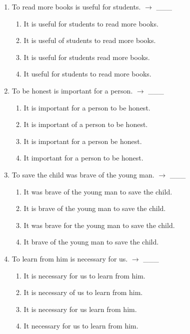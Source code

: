 \documentclass[11pt,a4paper]{ctexart}
\begin{document}
\begin{enumerate}[leftmargin=*,itemsep=4pt]
\begin{enumerate}[label=\Alph*.,leftmargin=2em,itemsep=1pt,topsep=2pt]
\item It is necessary of us to protect the environment.
\item It is necessary for us protect the environment.
\item It necessary for us to protect the environment.
\end{enumerate}
\item To read more books is useful for students. $\rightarrow$ \_\_\_
\begin{enumerate}[label=\Alph*.,leftmargin=2em,itemsep=1pt,topsep=2pt]
\item It is useful for students to read more books.
\item It is useful of students to read more books.
\item It is useful for students read more books.
\item It useful for students to read more books.
\end{enumerate}
\item To be honest is important for a person. $\rightarrow$ \_\_\_
\begin{enumerate}[label=\Alph*.,leftmargin=2em,itemsep=1pt,topsep=2pt]
\item It is important for a person to be honest.
\item It is important of a person to be honest.
\item It is important for a person be honest.
\item It important for a person to be honest.
\end{enumerate}
\item To save the child was brave of the young man. $\rightarrow$ \_\_\_
\begin{enumerate}[label=\Alph*.,leftmargin=2em,itemsep=1pt,topsep=2pt]
\item It was brave of the young man to save the child.
\item It is brave of the young man to save the child.
\item It was brave for the young man to save the child.
\item It brave of the young man to save the child.
\end{enumerate}
\item To learn from him is necessary for us. $\rightarrow$ \_\_\_
\begin{enumerate}[label=\Alph*.,leftmargin=2em,itemsep=1pt,topsep=2pt]
\item It is necessary for us to learn from him.
\item It is necessary of us to learn from him.
\item It is necessary for us learn from him.
\item It necessary for us to learn from him.
\end{enumerate}
\end{enumerate}
\end{document}

